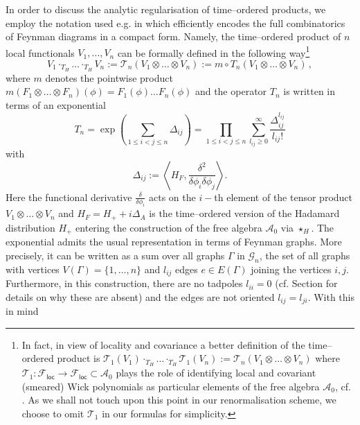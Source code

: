 \documentclass[10pt]{book}
\newcommand{\loc}{\mathsf{loc}}
\newcommand{\Acal}{\mathcal{A}}
\newcommand{\Fcal}{\mathcal{F}}
\theoremstyle{break}
\begin{document}
In order to discuss the analytic regularisation of time--ordered products, we employ the notation used e.g. in %
which efficiently encodes the full combinatorics of Feynman diagrams in a compact form. Namely, the time--ordered product of $n$ local functionals $V_1, \dots, V_n$ can be formally defined in the following way\footnote{%
In fact, in view of locality and covariance a better definition of the time--ordered product is $\mathcal{T}_1(V_1)\cdot_{T_H}  \dots \cdot_{T_H}    \mathcal{T}_1(V_n)    
:=
\mathcal{T}_n(V_1\otimes \dots \otimes V_n) $ where $\mathcal{T}_1:\Fcal_\loc\to\Fcal_\loc\subset\Acal_0$ plays the role of identifying local and covariant (smeared) Wick polynomials as particular elements of the free algebra $\Acal_0$, cf. %
. As we shall not touch upon this point in our renormalisation scheme, we choose to omit $\mathcal{T}_1$ in our formulas for simplicity.}
\begin{equation}
V_1\cdot_{T_H}  \dots \cdot_{T_H}    V_n    
:=
\mathcal{T}_n(V_1\otimes \dots \otimes V_n) 
:=  m \circ T_n (V_1\otimes \dots \otimes V_n)\,,
\end{equation}
where $m$ denotes the pointwise product $m(F_1\otimes \dots \otimes F_n)(\phi) = F_1(\phi)\dots F_n(\phi)$
and the operator $T_n$ is written in terms of an exponential 
%
\begin{equation} 
T_n = \exp\left(\sum_{1\leq i<j \leq n}\Delta_{ij}\right)= \prod_{1\leq i<j\leq n} \sum_{l_{ij} \geq 0}^\infty  \frac{\Delta_{ij}^{l_{ij}}}{l_{ij}!}
\end{equation}
%
with
%
\begin{equation}
\Delta_{ij} :=   \left\langle H_F, \frac{\delta^2}{\delta \phi_i \delta \phi_j} \right\rangle.
\end{equation}
%
Here the functional derivative $\frac{\delta}{\delta \phi_i}$ acts on the $i-$th element of the tensor product 
$V_1\otimes \dots \otimes V_n$ and $H_F=H_++i\Delta_A$ is the time--ordered version of the Hadamard distribution $H_+$ entering the construction of the free algebra $\Acal_0$ via $\star_H$.
The exponential %
admits the usual representation in terms of Feynman graphs. More precisely, it can be written as a sum over all graphs $\Gamma$ in $\mathcal{G}_n$, the set of all graphs with vertices $V(\Gamma)= \{ 1,\dots, n\}$ and $l_{ij}$ edges $e\in E(\Gamma)$  joining the vertices $i,j$. Furthermore, in this construction, there are no tadpoles $l_{ii}=0$ (cf. Section %
for details on why these are absent) and the edges are not oriented $l_{ij}=l_{ji}$. With this in mind 
\end{document}
